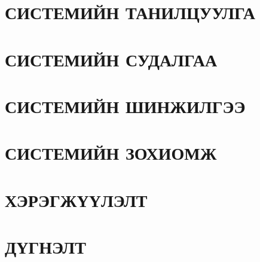 \chapter{СИСТЕМИЙН ТАНИЛЦУУЛГА}


\chapter{СИСТЕМИЙН СУДАЛГАА}


\chapter{СИСТЕМИЙН ШИНЖИЛГЭЭ}


\chapter{СИСТЕМИЙН ЗОХИОМЖ}


\chapter{ХЭРЭГЖҮҮЛЭЛТ}


\chapter{ДҮГНЭЛТ}

